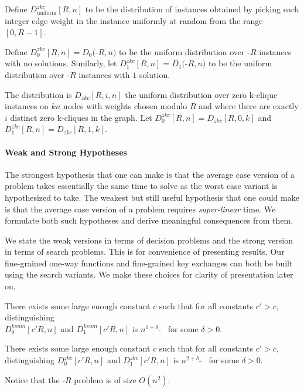 \begin{definition}
Define $D^{zkc}_{\textrm{uniform}}[R,n]$ to be the distribution of instances obtained by picking each integer edge weight in the instance uniformly at random from the range $[0,R-1]$.

Define $D^{zkc}_{0}[R,n] = D_0($\zkclique-$R, n)$ to be the uniform distribution over \zkclique-$R$ instances with no solutions. Similarly, let $D^{zkc}_{1}[R,n] = D_1($\zkclique-$R, n)$ to be the uniform distribution over \zkclique-$R$  instances with $1$ solution.

The distribution is $D_{zkc}[R,i,n]$ the uniform distribution over zero k-clique instances on $kn$ nodes with weights chosen modulo $R$ and where there are exactly $i$ distinct zero k-cliques in the graph.
Let $D^{zkc}_{0}[R,n] = D_{zkc}[R,0,k]$  and $D^{zkc}_{1}[R,n] = D_{zkc}[R,1,k]$.
\end{definition}

\paragraph{Weak and Strong Hypotheses}
The strongest hypothesis that one can make is that the average case version of a problem takes essentially the same time to solve as the worst case variant is hypothesized to take. The weakest but still useful hypothesis that one could make is that the average case version of a problem requires {\em super-linear} time. We formulate both such hypotheses and derive meaningful consequences from them.


We state the weak versions in terms of decision problems and the strong version in terms of search problems. This is for convenience of presenting results. Our fine-grained one-way functions and fine-grained key exchanges can both be built using the search variants. We make these choices for clarity of presentation later on. 

\begin{definition}[\Weakksum]\label{def:weak-k-sum}
	There exists some large enough constant $c$ such that for all constants $c'>c$, distinguishing\\$D^{ksum}_{0}[c'R,n]$ and $D^{ksum}_{1}[c'R,n]$ is
$n^{1+\delta}$-\ACIH~ for some $\delta>0$.
\end{definition}

\begin{definition}[\Weakzkc]
	There exists some large enough constant $c$ such that for all constants $c'>c$, distinguishing $D^{zkc}_{0}[c'R,n]$ and $D^{zkc}_{1}[c'R,n]$ is
	$n^{2+\delta}$-\ACIH~ for some $\delta>0$.
	
	Notice that the \zkclique-$R$ problem is of size $O(n^2)$.
\end{definition}

